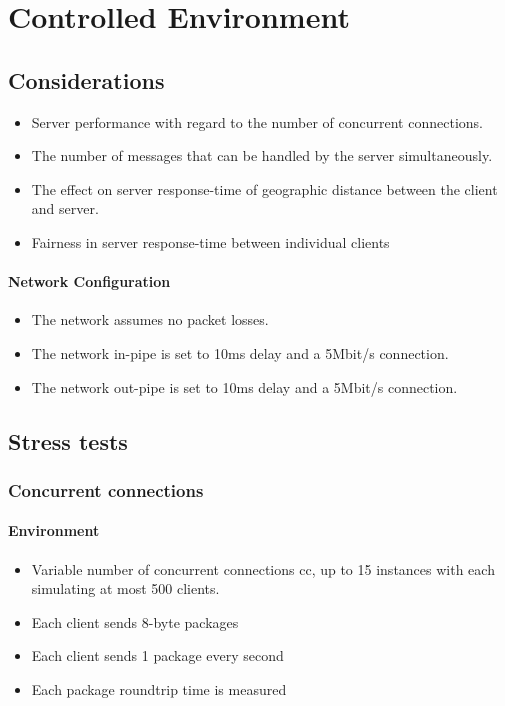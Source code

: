 \documentclass[12pt]{article}
\begin{document}
\section{Controlled Environment}
\subsection{Considerations}
\begin{itemize}
\item Server performance with regard to the number of concurrent connections.
\item The number of messages that can be handled by the server simultaneously.
\item The effect on server response-time of geographic distance between the client and server.
\item Fairness in server response-time between individual clients
\end{itemize}

\paragraph{Network Configuration}
\begin{itemize}
\item The network assumes no packet losses.
\item The network in-pipe is set to 10ms delay and a 5Mbit/s connection.
\item The network out-pipe is set to 10ms delay and a 5Mbit/s connection.
\end{itemize}



\subsection{Stress tests}

\subsubsection{Concurrent connections}
\paragraph{Environment}
\begin{itemize}
\item Variable number of concurrent connections cc, up to 15 instances with each simulating at most 500 clients.
\item Each client sends 8-byte packages
\item Each client sends 1 package every second
\item Each package roundtrip time is measured
\end{itemize}
\end{document}
